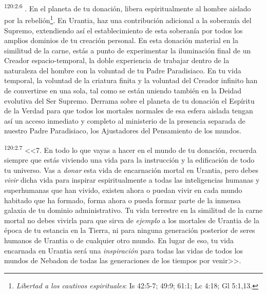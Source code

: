 \par 
\textsuperscript{120:2.6} . En el planeta de tu donación, libera espiritualmente al hombre aislado por la rebelión\footnote{\textit{Libertad a los cautivos espirituales}: Is 42:5-7; 49:9; 61:1; Lc 4:18; Gl 5:1,13.}. En Urantia, haz una contribución adicional a la soberanía del Supremo, extendiendo así el establecimiento de esta soberanía por todos los amplios dominios de tu creación personal. En esta donación material en la similitud de la carne, estás a punto de experimentar la iluminación final de un Creador espacio-temporal, la doble experiencia de trabajar dentro de la naturaleza del hombre con la voluntad de tu Padre Paradisiaco. En tu vida temporal, la voluntad de la criatura finita y la voluntad del Creador infinito han de convertirse en una sola, tal como se están uniendo también en la Deidad evolutiva del Ser Supremo. Derrama sobre el planeta de tu donación el Espíritu de la Verdad para que todos los mortales normales de esa esfera aislada tengan así un acceso inmediato y completo al ministerio de la presencia separada de nuestro Padre Paradisiaco, los Ajustadores del Pensamiento de los mundos\guillemotright.

\par 
\textsuperscript{120:2.7} <<7. En todo lo que vayas a hacer en el mundo de tu donación, recuerda siempre que estás viviendo una vida para la instrucción y la edificación de todo tu universo. Vas a \textit{donar} esta vida de encarnación mortal en Urantia, pero debes \textit{vivir} dicha vida para inspirar espiritualmente a todas las inteligencias humanas y superhumanas que han vivido, existen ahora o puedan vivir en cada mundo habitado que ha formado, forma ahora o pueda formar parte de la inmensa galaxia de tu dominio administrativo. Tu vida terrestre en la similitud de la carne mortal no debes vivirla para que sirva de \textit{ejemplo} a los mortales de Urantia de la época de tu estancia en la Tierra, ni para ninguna generación posterior de seres humanos de Urantia o de cualquier otro mundo. En lugar de eso, tu vida encarnada en Urantia será una \textit{inspiración} para todas las vidas de todos los mundos de Nebadon de todas las generaciones de los tiempos por venir>>.

